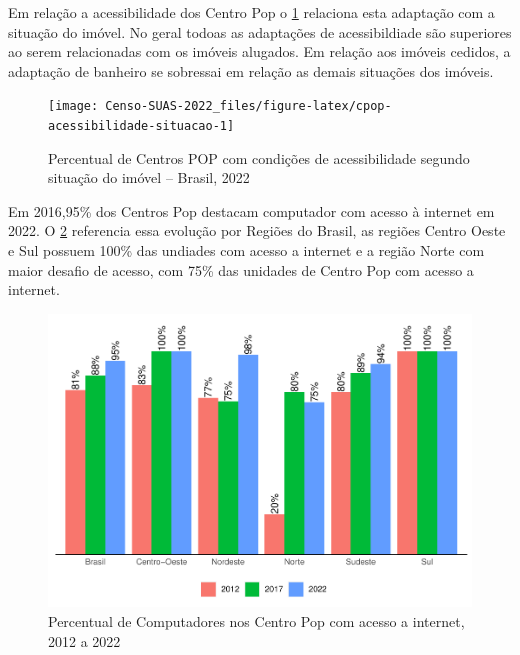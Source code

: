\documentclass[
  brazilian]{report}
\begin{document}
Em relação a acessibilidade dos Centro Pop o
\cref{fig:cpop-acessibilidade-situacao} relaciona esta adaptação com a
situação do imóvel. No geral todoas as adaptações de acessibildiade são
superiores ao serem relacionadas com os imóveis alugados. Em relação aos
imóveis cedidos, a adaptação de banheiro se sobressai em relação as
demais situações dos imóveis.

\begin{figure}
\texttt{[image: Censo-SUAS-2022\_files/figure-latex/cpop-acessibilidade-situacao-1]} \caption[Percentual de Centros POP com condições de acessibilidade segundo situação do imóvel – Brasil, 2022]{Percentual de Centros POP com condições de acessibilidade segundo situação do imóvel – Brasil, 2022}\label{fig:cpop-acessibilidade-situacao}
\end{figure}

Em 2016,95\% dos Centros Pop destacam computador com acesso à internet
em 2022. O \cref{fig:cpop-internet-percentual} referencia essa evolução
por Regiões do Brasil, as regiões Centro Oeste e Sul possuem 100\% das
undiades com acesso a internet e a região Norte com maior desafio de
acesso, com 75\% das unidades de Centro Pop com acesso a internet.

\begin{figure}
\includegraphics{Censo-SUAS-2022_files/figure-latex/cpop-internet-percentual-1} \caption[Percentual de Computadores nos Centro Pop com acesso a internet, 2012 a 2022]{Percentual de Computadores nos Centro Pop com acesso a internet, 2012 a 2022}\label{fig:cpop-internet-percentual}
\end{figure}
\end{document}
